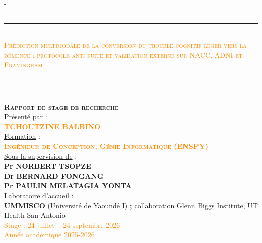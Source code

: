 \begin{titlingpage}
\begin{SingleSpace}
\begin{adjustwidth*}{\unitlength}{-\unitlength}
\vspace{0.3cm}
\begin{center}
\textcolor{darkorange}{\rule[0.5ex]{\linewidth}{2pt}\vspace*{-\baselineskip}\vspace*{2.5pt}}
\textcolor{darkorange}{\rule[0.5ex]{\linewidth}{1pt}}\\[3mm]
{\LARGE {\textcolor{darkorange}{\textsc{Prédiction multimodale de la conversion du trouble cognitif léger vers la démence : protocole anti-fuite et validation externe sur NACC, ADNI et Framingham}}} }\\[2mm]
\textcolor{darkorange}{\rule[0.5ex]{\linewidth}{1pt}\vspace*{-\baselineskip}\vspace{3.2pt}}
\textcolor{darkorange}{\rule[0.5ex]{\linewidth}{2pt}}\\[3mm]
{\large \textbf{\textsc{Rapport de stage de recherche}}}\\
\vspace{4mm}
{\underline{Présenté par} :} \\
\vspace{3mm}
{\Large \textsc{\textbf{\textcolor{darkorange}{TCHOUTZINE BALBINO}}}}\\
\vspace{4.5mm}
{\underline{Formation} :} \\
\vspace{3mm}
{\large \textsc{\textbf{\textcolor{darkorange}{Ingénieur de Conception, Génie Informatique (ENSPY)}}}}\\
\vspace{4mm}
{\underline{Sous la supervision de} :}\\
\vspace{4mm}
 {\large \textbf{Pr NORBERT TSOPZE} }\\
  {\large \textbf{Dr BERNARD FONGANG} }\\
  {\large \textbf{Pr PAULIN MELATAGIA YONTA} }\\
\vspace{4mm}
{\underline{Laboratoire d'accueil} :} \\
\vspace{3mm}
{\large \textbf{UMMISCO} (Université de Yaoundé I) ; collaboration Glenn Biggs Institute, UT Health San Antonio}\\
\vspace{8.5mm}
{\textcolor{darkorange}{\Large{Stage : 24 juillet -- 24 septembre 2026}}}\\
{\textcolor{darkorange}{\large{Année académique 2025-2026}}}
\end{center}

\end{adjustwidth*}

\end{SingleSpace}
\end{titlingpage}
